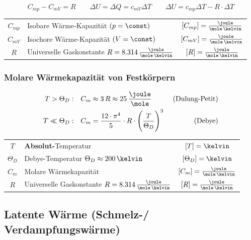 \vspace{-0.2cm}

$$ \boxed{ C_{mp} - C_{mV} = R } \qquad \Delta U = \Delta Q = c_{mV}\Delta T 
\qquad \Delta U = c_{mp} \Delta T - R \cdot \Delta T$$

\renewcommand{\arraystretch}{1.3}
\begin{tabular}{c l c}
	$C_{mp}$ 	& Isobare Wärme-Kapazität $(p = \const)$ 									& $[C_{mp}] = \frac{\joule}{\mole \, \kelvin}$	\\
	$C_{mV}$ 	& Isochore Wärme-Kapazität $(V = \const)$ 									& $[C_{mV}] = \frac{\joule}{\mole \, \kelvin}$	\\
	$R$			& Universelle Gaskonstante $R = 8.314 \, \frac{\joule}{\mole \, \kelvin}$ 	& $[R] = \frac{\joule}{\mole \, \kelvin}$
\end{tabular}
\renewcommand{\arraystretch}{1}


\subsubsection{Molare Wärmekapazität von Festkörpern}

\vspace{-0.4cm}

\begin{align*}
	T > \Theta_D: 	\quad &C_m \approx 3 \, R \approx 25 \, \frac{\joule}{\mole}  &\text{ (Dulung-Petit)} \\
	T \ll \Theta_D:	\quad &C_m = \frac{12 \cdot \pi^4}{5}  \cdot R \cdot  \Bigg( \frac{T}{\Theta_D}  \Bigg)^3  &\text{ (Debye)} 
\end{align*}


\renewcommand{\arraystretch}{1.3}
\begin{tabular}{c l c}
	$T$ 		& \textbf{Absolut-}Temperatur 												& $[T] = \kelvin$ 							\\
	$\Theta_D$ 	& Debye-Temperatur $\Theta_D \approx 200 \, \kelvin$ 						& $[\Theta_D] = \kelvin$ 					\\
	$C_m$ 		& Molare Wärmekapazität 													& $[C_m] = \frac{\joule}{\mole \, \kelvin}$ \\
	$R$			& Universelle Gaskonstante $R = 8.314 \, \frac{\joule}{\mole \, \kelvin}$ 	& $[R] = \frac{\joule}{\mole \, \kelvin}$
\end{tabular}
\renewcommand{\arraystretch}{1}


\subsection{Latente Wärme (Schmelz-/ Verdampfungswärme)}

